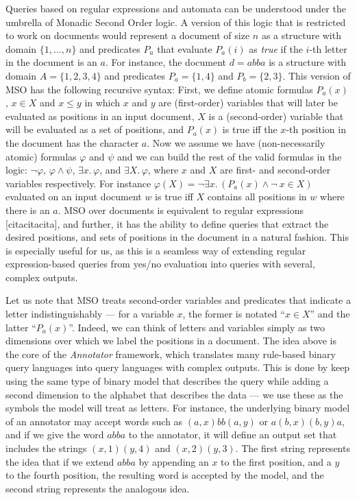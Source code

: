 Queries based on regular expressions and automata can be understood under the umbrella of Monadic Second Order logic. 
A version of this logic that is restricted to work on documents would represent a document of size $n$ as a structure with domain $\{1,\ldots, n\}$ and predicates $P_a$ that evaluate $P_a(i)$ as {\it true} if the $i$-th letter in the document is an $a$. For instance, the document $d = abba$ is a structure with domain $A = \{1,2,3,4\}$ and predicates $P_a = \{1, 4\}$ and $P_b = \{2, 3\}$. This version of MSO has the following recursive syntax: First, we define atomic formulas $P_a(x)$, $x\in X$ and $x\leq y$ in which $x$ and $y$ are (first-order) variables that will later be evaluated as positions in an input document, $X$ is a (second-order) variable that will be evaluated as a set of positions, and $P_a(x)$ is true iff the $x$-th position in the document has the character $a$. 
Now we assume we have (non-necessarily atomic) formulas $\varphi$ and $\psi$ and we can build the rest of the valid formulas in the logic: $\neg \varphi$, $\varphi \wedge \psi$, $\exists x .\, \varphi$, and $\exists X.\, \varphi$, where $x$ and $X$ are first- and second-order variables respectively. For instance $\varphi(X) = \neg\exists x.\,(P_a(x)\wedge \neg\  x\!\in\! X)$ evaluated on an input document $w$ is true iff $X$ contains all positions in $w$ where there is an $a$.
MSO over documents is equivalent to regular expressions [citacitacita], and further, it has the ability to define queries that extract the desired positions, and sets of positions in the document in a natural fashion. This is especially useful for us, as this is a seamless way of extending regular expression-based queries from yes/no evaluation into queries with several, complex outputs.


Let us note that MSO treats second-order variables and predicates that indicate a letter indistinguishably  --- for a variable $x$, the former is notated ``$x\in X$'' and the latter ``$P_{a}(x)$''. Indeed, we can think of letters and variables simply as two dimensions over which we label the positions in a document.  The idea above is the core of the {\it Annotator} framework, which translates many rule-based binary query languages into query languages with complex outputs. This is done by keep using the same type of binary model that describes the query while adding a second dimension to the alphabet that describes the data --- we use these as the symbols the model will treat as letters. For instance, the underlying binary model of an annotator may accept words such as  $(a,x)bb(a,y)$ or $a(b,x)(b,y)a$, and if we give the word $abba$ to the annotator, it will define an output set that includes the strings $(x,1)(y,4)$ and $(x,2)(y,3)$. The first string represents the idea that if we extend $abba$ by appending an $x$ to the first position, and a $y$ to the fourth position, the resulting word is accepted by the model, and the second string  represents the analogous idea.

